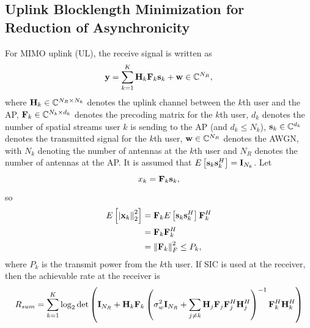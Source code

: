 \documentclass[a4paper, 12pt, onecolumn, journal, twoside, draftclsnofoot]{IEEEtran}
\begin{document}
\subsection{Uplink Blocklength Minimization for Reduction of Asynchronicity}
For MIMO uplink (UL), the receive signal is written as
\begin{equation*}
	{\bf y} = \sum_{k=1}^K  {\bf H}_k {\bf F}_k {\bf s}_k + {\bf w} \in \mathbb{C}^{N_R},
\end{equation*}
where 
${\bf H}_k \in \mathbb{C}^{N_R \times N_k}$ denotes the uplink channel between the $k$th user and the AP, ${\bf F}_k \in \mathbb{C}^{N_k \times d_k}$ denotes the precoding matrix for the $k$th user, $d_k$ denotes the number of spatial streams user $k$ is sending to the AP (and $d_k \leq N_k$), ${\bf s}_k \in \mathbb{C}^{d_k}$ denotes the transmitted signal for the $k$th user, ${\bf w} \in \mathbb{C}^{N_R}$  denotes the AWGN, with $N_k$ denoting the number of antennas at the $k$th user and $N_R$ denotes the number of antennas at the AP.  It is assumed that $E \left[ {\bf s}_k {\bf s}_k^H \right] = {\bf I}_{N_k}$.  Let 
\begin{equation*}
	x_k = {\bf F}_k {\bf s}_k,
\end{equation*}
so
\begin{align*}
	E \left[ \left| {\bf x}_k \right\|_2^2 \right] &= {\bf F}_k E \left[ {\bf s}_k {\bf s}_k^H \right] {\bf F}_k^H \\
	&= {\bf F}_k {\bf F}_k^H  \\
	&=  \left\| {\bf F}_k \right\|_F^2  \leq P_k,
\end{align*}
where $P_k$ is the transmit power from the $k$th user.  If SIC is used at the receiver, then the achievable rate at the receiver is
\begin{equation*}
	R_{sum} = \sum_{k=1}^K  \log_2 \det \left(  {\bf I}_{N_R}  +  {\bf H}_k {\bf F}_k     \left(  \sigma_w^2 {\bf I}_{N_R}  + \sum_{j \neq k}  {\bf H}_j {\bf F}_j {\bf F}_j^H {\bf H}_j^H  \right)^{-1}     {\bf F}_k^H {\bf H}_k^H  \right) 
\end{equation*}
\end{document}
